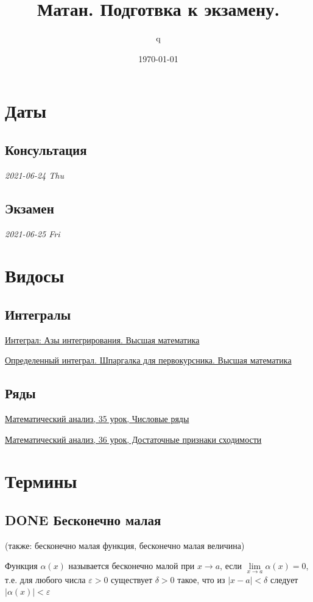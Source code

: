 \documentclass[11pt]{article}
\author{q}
\date{\today}
\title{Матан. Подготвка к экзамену.}
\begin{document}
\maketitle
\tableofcontents

\section{Даты}
\label{sec:orgd8c78c1}
\subsection{Консультация}
\label{sec:orga5a786e}
\emph{2021-06-24 Thu}
\subsection{Экзамен}
\label{sec:org70f92dd}
\emph{2021-06-25 Fri}

\section{Видосы}
\label{sec:org21d61d3}
\subsection{Интегралы}
\label{sec:org3f423b3}
\href{https://www.youtube.com/watch?v=nCx6FTChgow}{Интеграл: Азы интегрирования. Высшая математика}

\href{https://www.youtube.com/watch?v=wEmtlqJy2MM}{Определенный интеграл. Шпаргалка для первокурсника. Высшая математика}
\subsection{Ряды}
\label{sec:org4dddac7}
\href{https://www.youtube.com/watch?v=XcofHzGx9Ug}{Математический анализ, 35 урок, Числовые ряды}

\href{https://www.youtube.com/watch?v=uq78fpEas5I}{Математический анализ, 36 урок, Достаточные признаки сходимости}
\section{Термины}
\label{sec:org1538501}
\subsection{{\bfseries\sffamily DONE} Бесконечно малая}
\label{sec:org1b1dc6a}
(также: бесконечно малая функция, бесконечно малая величина)

Функция \(\alpha(x)\) называется бесконечно малой при \(x\to a\), если \(\lim\limits_{x\to a}\alpha(x)=0\), т.е. для любого числа \(\varepsilon >0\) существует \(\delta>0\) такое, что из \(|x−a|<\delta\) следует \(|\alpha(x)|<\varepsilon\)
\end{document}
